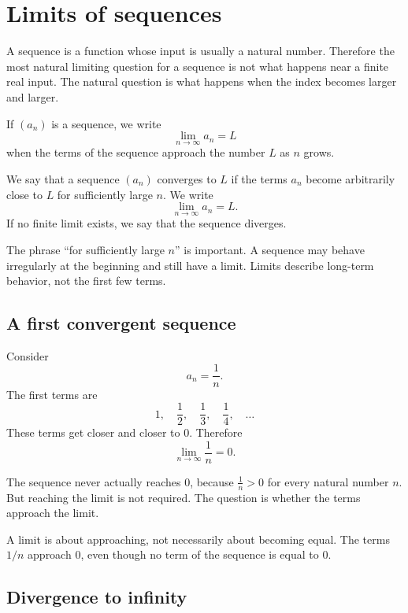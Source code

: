 \section{Limits of sequences}

A sequence is a function whose input is usually a natural number. Therefore the most natural limiting question for a sequence is not what happens near a finite real input. The natural question is what happens when the index becomes larger and larger.

If \((a_n)\) is a sequence, we write
\[
\lim_{n\to\infty} a_n=L
\]
when the terms of the sequence approach the number \(L\) as \(n\) grows.

\begin{definitionbox}
We say that a sequence \((a_n)\) converges to \(L\) if the terms \(a_n\) become arbitrarily close to \(L\) for sufficiently large \(n\). We write
\[
\lim_{n\to\infty}a_n=L.
\]
If no finite limit exists, we say that the sequence diverges.
\end{definitionbox}

The phrase ``for sufficiently large \(n\)'' is important. A sequence may behave irregularly at the beginning and still have a limit. Limits describe long-term behavior, not the first few terms.

\subsection*{A first convergent sequence}

Consider
\[
a_n=\frac1n.
\]
The first terms are
\[
1,\quad \frac12,\quad \frac13,\quad \frac14,\quad \ldots
\]
These terms get closer and closer to \(0\). Therefore
\[
\lim_{n\to\infty}\frac1n=0.
\]

The sequence never actually reaches \(0\), because \(\frac1n>0\) for every natural number \(n\). But reaching the limit is not required. The question is whether the terms approach the limit.

\begin{remarkbox}
A limit is about approaching, not necessarily about becoming equal. The terms \(1/n\) approach \(0\), even though no term of the sequence is equal to \(0\).
\end{remarkbox}

\subsection*{Divergence to infinity}

